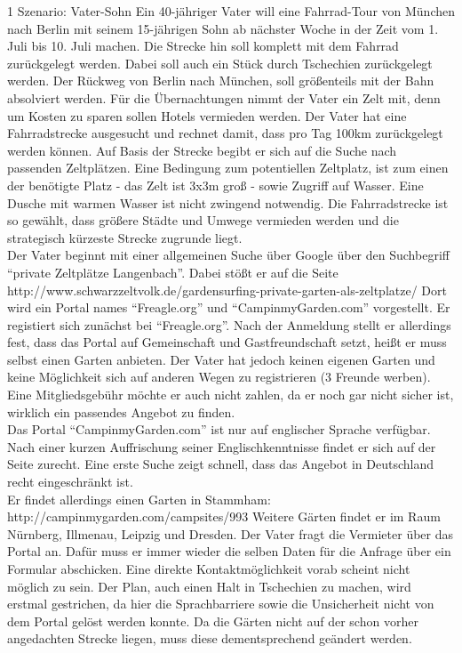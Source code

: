 1 Szenario: Vater-Sohn
Ein 40-jähriger Vater will eine Fahrrad-Tour von München nach Berlin mit seinem 15-jährigen Sohn ab nächster Woche in der Zeit vom 1. Juli bis 10. Juli machen. Die Strecke hin soll komplett mit dem Fahrrad zurückgelegt werden. Dabei soll auch ein Stück durch Tschechien zurückgelegt werden. Der Rückweg von Berlin nach München, soll größenteils mit der Bahn absolviert werden. Für die Übernachtungen nimmt der Vater ein Zelt mit, denn um Kosten zu sparen sollen Hotels vermieden werden.
Der Vater hat eine Fahrradstrecke ausgesucht und rechnet damit, dass pro Tag 100km zurückgelegt werden können. Auf Basis der Strecke begibt er sich auf die Suche nach passenden Zeltplätzen. Eine Bedingung zum potentiellen Zeltplatz, ist zum einen der benötigte Platz - das Zelt ist 3x3m groß - sowie Zugriff auf Wasser. Eine Dusche mit warmen Wasser ist nicht zwingend notwendig.
Die Fahrradstrecke ist so gewählt, dass größere Städte und Umwege vermieden werden und die strategisch kürzeste Strecke zugrunde liegt.\\
Der Vater beginnt mit einer allgemeinen Suche über Google über den Suchbegriff “private Zeltplätze Langenbach”. Dabei stößt er auf die Seite\\ http://www.schwarzzeltvolk.de/gardensurfing-private-garten-als-zeltplatze/
Dort wird ein Portal names “Freagle.org” und “CampinmyGarden.com” vorgestellt. Er registiert sich zunächst bei “Freagle.org”. Nach der Anmeldung stellt er allerdings fest, dass das Portal auf Gemeinschaft und Gastfreundschaft setzt, heißt er muss selbst einen Garten anbieten. Der Vater hat jedoch keinen eigenen Garten und keine Möglichkeit sich auf anderen Wegen zu registrieren (3 Freunde werben). Eine Mitgliedsgebühr möchte er auch nicht zahlen, da er noch gar nicht sicher ist, wirklich ein passendes Angebot zu finden.\\
Das Portal “CampinmyGarden.com” ist nur auf englischer Sprache verfügbar. Nach einer kurzen Auffrischung seiner Englischkenntnisse findet er sich auf der Seite zurecht. Eine erste Suche zeigt schnell, dass das Angebot in Deutschland recht eingeschränkt ist.\\
Er findet allerdings einen Garten in Stammham: http://campinmygarden.com/campsites/993
Weitere Gärten findet er im Raum Nürnberg, Illmenau, Leipzig und Dresden. Der Vater fragt die Vermieter über das Portal an. Dafür muss er immer wieder die selben Daten für die Anfrage über ein Formular abschicken. Eine direkte Kontaktmöglichkeit vorab scheint nicht möglich zu sein.
Der Plan, auch einen Halt in Tschechien zu machen, wird erstmal gestrichen, da hier die Sprachbarriere sowie die Unsicherheit nicht von dem Portal gelöst werden konnte.
Da die Gärten nicht auf der schon vorher angedachten Strecke liegen, muss diese dementsprechend geändert werden.\\

